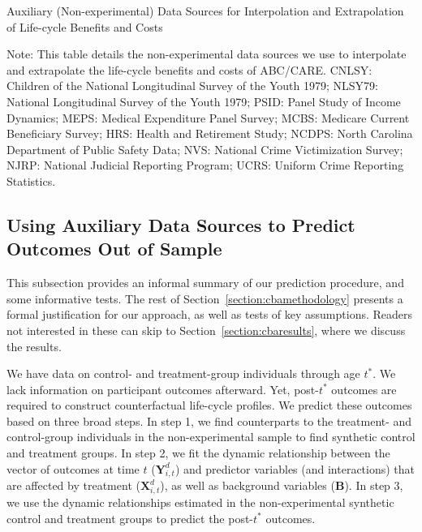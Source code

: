 \begin{table}[!htbp]
\begin{threeparttable}
\caption{Auxiliary (Non-experimental) Data Sources for Interpolation and Extrapolation of Life-cycle Benefits and Costs} \label{table:sources}
\footnotesize

\begin{tablenotes}
\footnotesize
Note: This table details the non-experimental data sources we use to interpolate and extrapolate the life-cycle benefits and costs of ABC/CARE. CNLSY: Children of the National Longitudinal Survey of the Youth 1979; NLSY79: National Longitudinal Survey of the Youth 1979; PSID: Panel Study of Income Dynamics; MEPS: Medical Expenditure Panel Survey; MCBS: Medicare Current Beneficiary Survey; HRS: Health and Retirement Study; NCDPS: North Carolina Department of Public Safety Data; NVS: National Crime Victimization Survey; NJRP: National Judicial Reporting Program; UCRS: Uniform Crime Reporting Statistics.
\end{tablenotes}
\end{threeparttable}
\end{table}


\subsection{Using Auxiliary Data Sources to Predict Outcomes Out of Sample}\label{sec:usingaux}

This subsection provides an informal summary of our prediction procedure, and some informative tests. The rest of Section~\ref{section:cbamethodology} presents a formal justification for our approach, as well as tests of key assumptions. Readers not interested in these can skip to Section~\ref{section:cbaresults}, where we discuss the results.

We have data on control- and treatment-group individuals through age $t^{\ast}$. We lack information on participant outcomes afterward. Yet, post-$t^{\ast}$ outcomes are required to construct counterfactual life-cycle profiles. We predict these outcomes based on three broad steps. In step 1, we find counterparts to the treatment- and control-group individuals in the non-experimental sample to find synthetic control and treatment groups. In step 2, we fit the dynamic relationship between the vector of outcomes at time $t$ ($\bm{Y}^{d}_{i,t}$) and predictor variables (and interactions) that are affected by treatment ($\bm{X}^{d}_{i,t}$), as well as background variables ($\bm{B}$). In step 3, we use the dynamic relationships estimated in the non-experimental synthetic control and treatment groups to predict the post-$t^{\ast}$ outcomes.


